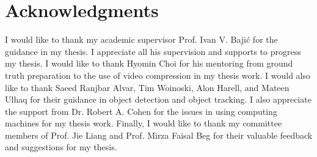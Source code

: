 \chapter*{Acknowledgments}

I would like to thank my academic supervisor Prof. Ivan V. Bajić for the guidance in my thesis. I appreciate all his supervision and supports to progress my thesis. I would like to thank Hyomin Choi for his mentoring from ground truth preparation to the use of video compression in my thesis work. I would also like to thank Saeed Ranjbar Alvar, Tim Woinoski, Alon Harell, and Mateen Ulhaq for their guidance in object detection and object tracking. I also appreciate the support from Dr. Robert A. Cohen for the issues in using computing machines for my thesis work. Finally, I would like to thank my committee members of Prof. Jie Liang and Prof. Mirza Faisal Beg for their valuable feedback and suggestions for my thesis.